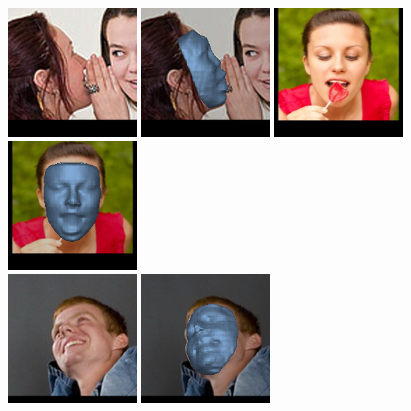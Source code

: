 \begin{figure}
  \centering
\includegraphics[width=3.4cm]{img/failures/image00400_img.png}
\includegraphics[width=3.4cm]{img/failures/image00400_vol.png} \hspace{2mm}
\includegraphics[width=3.4cm]{img/failures/image00782_img.png}
\includegraphics[width=3.4cm]{img/failures/image00782_vol.png}  \\ [0.5mm]
\includegraphics[width=3.4cm]{img/failures/image00795_img.png}
\includegraphics[width=3.4cm]{img/failures/image00795_vol.png} \hspace{2mm}

\end{figure}
